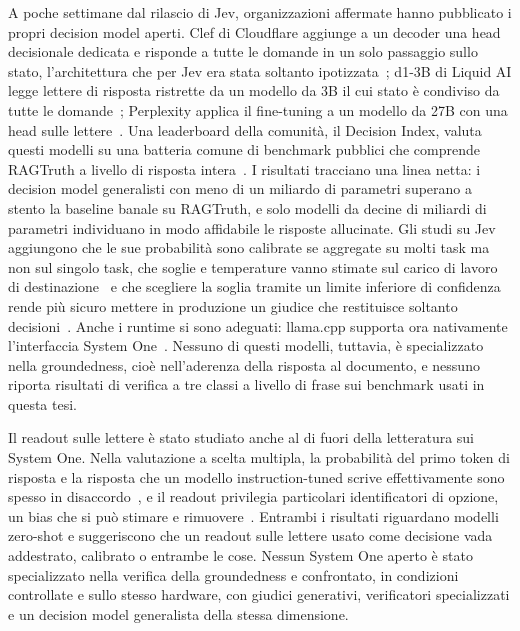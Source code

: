A poche settimane dal rilascio di Jev, organizzazioni affermate hanno pubblicato i propri decision model aperti. Clef di
Cloudflare aggiunge a un decoder una head decisionale dedicata e risponde a tutte le domande in un solo passaggio sullo
stato, l'architettura che per Jev era stata soltanto ipotizzata~\cite{cloudflare2026clef}; d1-3B di Liquid AI legge
lettere di risposta ristrette da un modello da 3B il cui stato è condiviso da tutte le domande~\cite{liquid2026d1};
Perplexity applica il fine-tuning a un modello da 27B con una head sulle lettere~\cite{perplexity2026decider}. Una
leaderboard della comunità, il Decision Index, valuta questi modelli su una batteria comune di benchmark pubblici che
comprende RAGTruth a livello di risposta intera~\cite{decisionindex2026}. I risultati tracciano una linea netta: i
decision model generalisti con meno di un miliardo di parametri superano a stento la baseline banale su RAGTruth, e solo
modelli da decine di miliardi di parametri individuano in modo affidabile le risposte allucinate. Gli studi su Jev
aggiungono che le sue probabilità sono calibrate se aggregate su molti task ma non sul singolo task, che soglie e
temperature vanno stimate sul carico di lavoro di destinazione~\cite{guo2026justaskjev,li2026jevjudge} e che scegliere
la soglia tramite un limite inferiore di confidenza rende più sicuro mettere in produzione un giudice che restituisce
soltanto decisioni~\cite{li2026jevjudge}. Anche i runtime si sono adeguati: llama.cpp supporta ora nativamente
l'interfaccia System One~\cite{llamacpp}. Nessuno di questi modelli, tuttavia, è specializzato nella groundedness, cioè
nell'aderenza della risposta al documento, e nessuno riporta risultati di verifica a tre classi a livello di frase sui
benchmark usati in questa tesi.

Il readout sulle lettere è stato studiato anche al di fuori della letteratura sui System One. Nella valutazione a scelta
multipla, la probabilità del primo token di risposta e la risposta che un modello instruction-tuned scrive effettivamente
sono spesso in disaccordo~\cite{wang2024myanswerc}, e il readout privilegia particolari identificatori di opzione, un
bias che si può stimare e rimuovere~\cite{zheng2024mcq}. Entrambi i risultati riguardano modelli zero-shot e suggeriscono
che un readout sulle lettere usato come decisione vada addestrato, calibrato o entrambe le cose. Nessun System One aperto
è stato specializzato nella verifica della groundedness e confrontato, in condizioni controllate e sullo stesso hardware,
con giudici generativi, verificatori specializzati e un decision model generalista della stessa dimensione.

